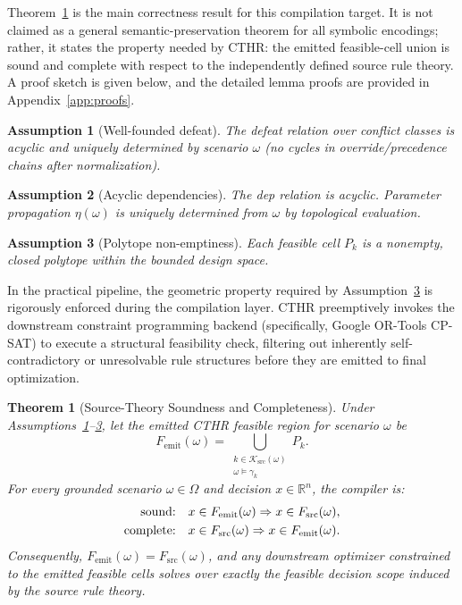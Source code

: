 ﻿\documentclass[a4paper,fleqn]{cas-dc}
\newtheorem{theorem}{Theorem}
\newtheorem{assumption}{Assumption}
\newcommand{\RR}{\mathbb{R}}
\newcommand{\CTHR}{\textsc{CTHR}}
\begin{document}
Theorem~\ref{thm:sp} is the main correctness result for this compilation target. It is not claimed as a general semantic-preservation theorem for all symbolic encodings; rather, it states the property needed by \CTHR{}: the emitted feasible-cell union is sound and complete with respect to the independently defined source rule theory. A proof sketch is given below, and the detailed lemma proofs are provided in Appendix~\ref{app:proofs}.

\begin{assumption}[Well-founded defeat]\label{ass:defeat}
The defeat relation over conflict classes is acyclic and uniquely determined by scenario $\omega$ (no cycles in override/precedence chains after normalization).
\end{assumption}

\begin{assumption}[Acyclic dependencies]\label{ass:dep}
The \textsf{dep} relation is acyclic. Parameter propagation $\eta(\omega)$ is uniquely determined from $\omega$ by topological evaluation.
\end{assumption}

\begin{assumption}[Polytope non-emptiness]\label{ass:nonempty}
Each feasible cell $P_k$ is a nonempty, closed polytope within the bounded design space.
\end{assumption}

In the practical pipeline, the geometric property required by Assumption~\ref{ass:nonempty} is rigorously enforced during the compilation layer. CTHR preemptively invokes the downstream constraint programming backend (specifically, Google OR-Tools CP-SAT) to execute a structural feasibility check, filtering out inherently self-contradictory or unresolvable rule structures before they are emitted to final optimization.

\begin{theorem}[Source-Theory Soundness and Completeness]\label{thm:sp}
Under Assumptions~\ref{ass:defeat}--\ref{ass:nonempty}, let the emitted \CTHR{} feasible region for scenario $\omega$ be
\begin{equation}
  F_{\mathrm{emit}}(\omega)=
  \bigcup_{\substack{k\in\mathcal{K}_{\mathrm{src}}(\omega)\\ \omega\models\gamma_k}} P_k .
  \label{eq:femit}
\end{equation}
For every grounded scenario $\omega\in\Omega$ and decision $x\in\RR^n$, the compiler is:
\begin{align}
\textnormal{sound:}\quad & x\in F_{\mathrm{emit}}(\omega)\Rightarrow x\in F_{\mathrm{src}}(\omega), \label{eq:soundness}\\
\textnormal{complete:}\quad & x\in F_{\mathrm{src}}(\omega)\Rightarrow x\in F_{\mathrm{emit}}(\omega). \label{eq:completeness}
\end{align}
Consequently, $F_{\mathrm{emit}}(\omega)=F_{\mathrm{src}}(\omega)$, and any downstream optimizer constrained to the emitted feasible cells solves over exactly the feasible decision scope induced by the source rule theory.
\end{theorem}
\end{document}

